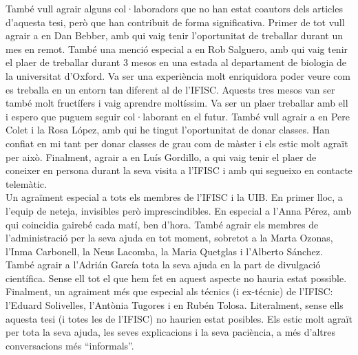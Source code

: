 {%
També vull agrair alguns col·laboradors que no han estat coautors dels articles
d'aquesta tesi, però que han contribuit de forma significativa. Primer de tot
vull agrair a en Dan Bebber, amb qui vaig tenir l'oportunitat de treballar
durant un mes en remot. També una menció especial a en Rob Salguero, amb qui
vaig tenir el plaer de treballar durant 3 mesos en una estada al departament de
biologia de la universitat d'Oxford. Va ser una experiència molt enriquidora
poder veure com es treballa en un entorn tan diferent al de l'IFISC. Aquests
tres mesos van ser també molt fructífers i vaig aprendre moltíssim. Va ser un
plaer treballar amb ell i espero que puguem seguir col·laborant en el futur.
També vull agrair a en Pere Colet i la Rosa López, amb qui he tingut
l'oportunitat de donar classes. Han confiat en mi tant per donar classes de
grau com de màster i els estic molt agraït per això. Finalment, agrair a en
Luís Gordillo, a qui vaig tenir el plaer de coneixer en persona durant la seva
visita a l'IFISC i amb qui segueixo en contacte telemàtic. \\

Un agraïment especial a tots els membres de l'IFISC i la UIB. En primer lloc,
a l'equip de neteja, invisibles però imprescindibles. En especial a l'Anna
Pérez, amb qui coincidia gairebé cada matí, ben d'hora. També agrair els
membres de l'administració per la seva ajuda en tot moment, sobretot a la Marta
Ozonas, l'Inma Carbonell, la Neus Lacomba, la Maria Quetglas i l'Alberto
Sánchez. També agrair a l'Adrián García tota la seva ajuda en la part de
divulgació científica. Sense ell tot el que hem fet en aquest aspecte no hauria
estat possible. Finalment, un agraiment més que especial als técnics (i
ex-técnic) de l'IFISC: l'Eduard Solivelles, l'Antònia Tugores i en Rubén
Tolosa. Literalment, sense ells aquesta tesi (i totes les de l'IFISC) no
haurien estat posibles. Els estic molt agraït per tota la seva ajuda, les seves
explicacions i la seva paciència, a més d'altres conversacions més
``informals''. \\

}
